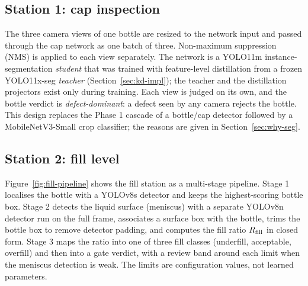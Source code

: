 \subsection{Station 1: cap inspection}
The three camera views of one bottle are resized to the network input and passed through the cap network as one batch of three. Non-maximum suppression (NMS) is applied to each view separately. The network is a YOLO11m instance-segmentation \emph{student} that was trained with feature-level distillation from a frozen YOLO11x-seg \emph{teacher} (Section~\ref{sec:kd-impl}); the teacher and the distillation projectors exist only during training. Each view is judged on its own, and the bottle verdict is \emph{defect-dominant}: a defect seen by any camera rejects the bottle. This design replaces the Phase 1 cascade of a bottle/cap detector followed by a MobileNetV3-Small crop classifier; the reasons are given in Section~\ref{sec:why-seg}.

\subsection{Station 2: fill level}
Figure~\ref{fig:fill-pipeline} shows the fill station as a multi-stage pipeline. Stage 1 localises the bottle with a YOLOv8s detector and keeps the highest-scoring bottle box. Stage 2 detects the liquid surface (meniscus) with a separate YOLOv8n detector run on the full frame, associates a surface box with the bottle, trims the bottle box to remove detector padding, and computes the fill ratio $R_{\mathrm{fill}}$ in closed form. Stage 3 maps the ratio into one of three fill classes (underfill, acceptable, overfill) and then into a gate verdict, with a review band around each limit when the meniscus detection is weak. The limits are configuration values, not learned parameters.

